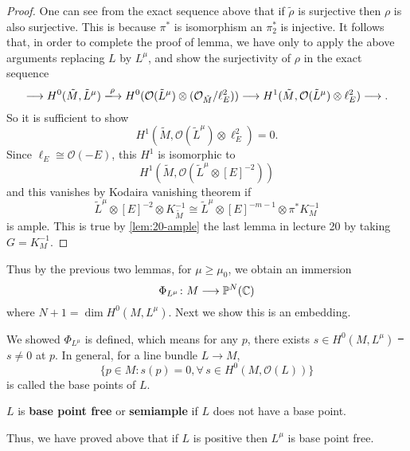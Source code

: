 \documentclass[12pt]{article}
\begin{document}
\begin{proof}
  One can see from the exact sequence above that if \(\tilde{\rho}\) is
  surjective then \(\rho\) is also surjective. This is because \(\pi^*\)
  is isomorphism an \(\pi_2^*\) is injective. It follows that, in order to
  complete the proof of lemma, we have only to apply the above arguments
  replacing \(L\) by \(L^\mu\), and show the surjectivity of \(\rho\) in the
  exact sequence \[
    \lrr H^0(\tilde{M},\tilde{L}^\mu)\xrr{\rho}H^0(\mathcal{O}(\tilde{L}^\mu)
    \otimes(\mathcal{O}_{\tilde{M}}/\ell_E^2))\lrr H^1(\tilde{M},\mathcal{O}(
    \tilde{L}^\mu)\otimes \ell_E^2)\lrr 
  .\] So it is sufficient to show \[
    H^1(\tilde{M},\mathcal{O}(\tilde{L}^\mu)\otimes \ell_E^2)=0
  .\] Since \(\ell_E\cong \mathcal{O}(-E)\), this \(H^1\) is isomorphic to \[
  H^1(\tilde{M},\mathcal{O}(\tilde{L}^\mu\otimes [E]^{-2}))
  \] and this vanishes by Kodaira vanishing theorem if \[
    \tilde{L}^{\mu}\otimes [E]^{-2}\otimes K_{\tilde{M}}^{-1}\cong 
    \tilde{L}^{\mu}\otimes [E]^{-m-1}\otimes \pi^*K_M^{-1}
  \] is ample. This is true by
  \ifdefined\FullBook \cref{lem:20-ample}
  \else the last lemma in lecture 20
  \fi by taking \(G=K_M^{-1}\).
\end{proof}

Thus by the previous two lemmas, for \(\mu\ge \mu_0\), we obtain an immersion \[
  \Phi_{L^\mu}\colon M\longrightarrow \mathbb{P}^N(\mathbb{C})
\] where \(N+1=\dim H^0(M,L^\mu)\). Next we show this is an embedding.

\begin{remark}
  We showed \(\Phi_{L^\mu}\) is defined, which means for any \(p\), there exists
  \(s\in H^0(M,L^\mu)\) \st\ \(s\neq 0\) at \(p\). In general, for a line bundle
  \(L\to M\), \[
    \{p\in M:s(p)=0,\forall\,s\in H^0(M,\mathcal{O}(L))\}
  \] is called the base points of \(L\).
\end{remark}
\begin{definition}
  \(L\) is \textbf{base point free} or \textbf{semiample} if \(L\) does not
  have a base point. 
\end{definition}
Thus, we have proved above that if \(L\) is positive then
\(L^\mu\) is base point free.
\end{document}
